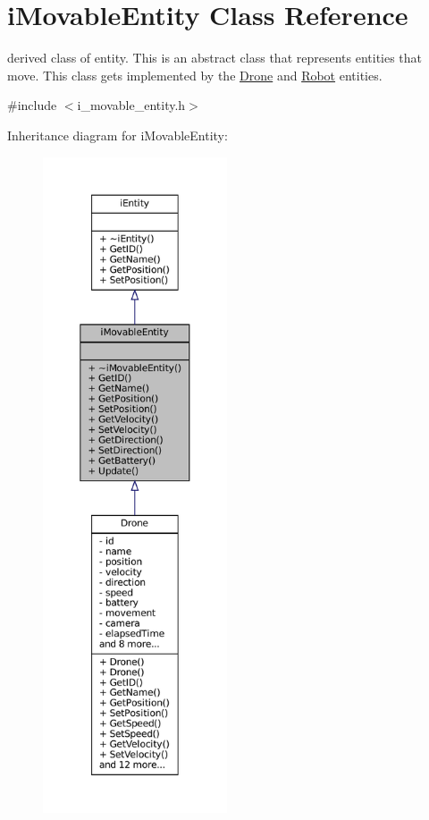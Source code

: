 \hypertarget{classiMovableEntity}{}\section{i\+Movable\+Entity Class Reference}
\label{classiMovableEntity}


derived class of entity. This is an abstract class that represents entities that move. This class gets implemented by the \hyperlink{classDrone}{Drone} and \hyperlink{classRobot}{Robot} entities.  




{\ttfamily \#include $<$i\+\_\+movable\+\_\+entity.\+h$>$}



Inheritance diagram for i\+Movable\+Entity\+:\nopagebreak
\begin{figure}[H]
\begin{center}
\leavevmode
\includegraphics[height=550pt]{classiMovableEntity__inherit__graph}
\end{center}
\end{figure}


